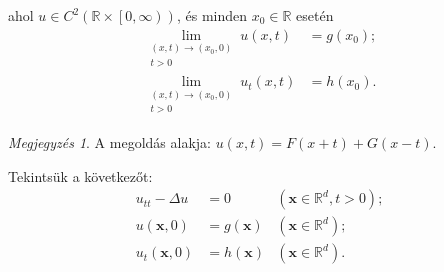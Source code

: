 \documentclass[%
	DIV=15,appendixprefix]{scrreprt}
\theoremstyle{definition}
\theoremstyle{remark}
\newtheorem*{megj}{Megjegyzés}
\begin{document}
ahol $ u \in C^{ 2 } \left( \mathbb{ R } \times \left.\left[ 0,{} \infty \right)\right.\right) $, és
minden $ x_{ 0 } \in \mathbb{ R } $ esetén
\begin{equation*}
	\begin{aligned}
		\lim_{ \substack{ \left( x,{} t \right) \rightarrow \left( x_{ 0 },{} 0 \right)\\t > 0 } }
		u \left( x,{} t \right) 		&= g \left( x_{ 0 } \right);\\
		\lim_{ \substack{ \left( x,{} t \right) \rightarrow \left( x_{ 0 },{} 0 \right)\\t > 0 } }
		u_{ t } \left( x,{} t \right) 	&= h \left( x_{ 0 } \right).
	\end{aligned}
\end{equation*}
\begin{megj}
	A megoldás alakja: $ u \left( x,{} t \right) = F\left( x + t \right) + G \left( x - t \right) $.
\end{megj}
%
Tekintsük a következőt:
\begin{equation*}
	\begin{aligned}
		u_{ tt } - \Delta u 						&= 0 								&
			\left( \mathbf{ x } \in \mathbb{ R }^{ d },{} t > 0 \right);\\
		u \left( \mathbf{ x },{} 0 \right) 			&= g \left( \mathbf{ x } \right) 	&
			\left( \mathbf{ x } \in \mathbb{ R }^{ d } \right);\\
		u_{ t } \left( \mathbf{ x },{} 0 \right) 	&= h \left( \mathbf{ x } \right) 	&
			\left( \mathbf{ x } \in \mathbb{ R }^{ d } \right).
	\end{aligned}
\end{equation*}
\end{document}
